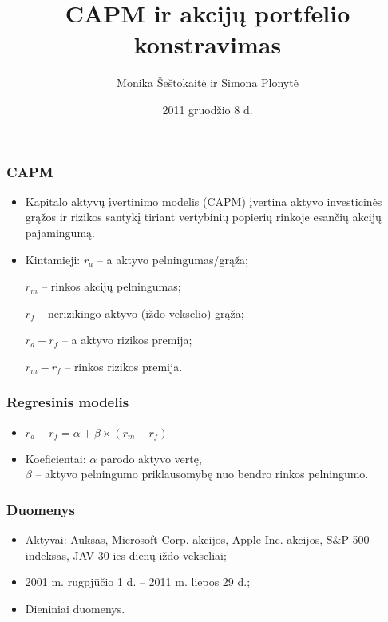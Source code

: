 \documentclass[utf8,hyperref={unicode},xcolor=dvipsnames]{beamer}
\title[CAPM]{CAPM ir akcijų portfelio konstravimas}
\author[ ]{Monika Šeštokaitė ir Simona Plonytė}
\institute[Vilnius University] {
    
    Vilniaus Universitetas
    \and
    
   Matematikos ir informatikos fakultetas
\and
Ekonometrinės analizės katedra
 }
\date{2011 gruodžio 8 d.}
\theoremstyle{change}\newtheorem{teorema}{Teiginys}
\theoremstyle{change}\newtheorem{salyga}{}
\begin{document}
\begin{frame}
    \titlepage
\end{frame}

\begin{frame}
    \frametitle{CAPM} 
    \begin{itemize}
	\item Kapitalo aktyvų įvertinimo modelis (CAPM) įvertina aktyvo investicinės grąžos ir rizikos santykį tiriant vertybinių popierių rinkoje esančių akcijų pajamingumą.
    \item Kintamieji: $r_a$ -- a aktyvo pelningumas/grąža; 

$r_m$ -- rinkos akcijų pelningumas; 

$r_f$ -- nerizikingo aktyvo (iždo vekselio) grąža; 

$r_a-r_f$ -- a aktyvo rizikos premija; 

$r_m - r_f$ -- rinkos rizikos premija.
    \end{itemize}
\end{frame}
\begin{frame}
    \frametitle{Regresinis modelis} 
    \begin{itemize}
	\item $r_a - r_f = \alpha + \beta \times (r_m - r_f)$
	\item Koeficientai: $ \alpha $ parodo aktyvo vertę,\\ $ \beta $ -- aktyvo pelningumo priklausomybę nuo bendro rinkos pelningumo.
	

	



    \end{itemize}
\end{frame}
\begin{frame}
    \frametitle{Duomenys} 
    \begin{itemize}
 	\item Aktyvai: Auksas, Microsoft Corp. akcijos, Apple Inc. akcijos, S\&P 500 indeksas, JAV 30-ies dienų iždo vekseliai;
	\item 2001 m. rugpjūčio 1 d. -- 2011 m. liepos 29 d.;
	\item Dieniniai duomenys.

    \end{itemize}
\end{frame}
\end{document}
